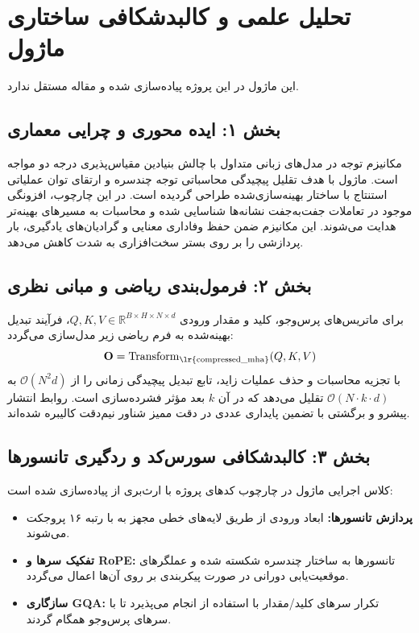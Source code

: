 \section{تحلیل علمی و کالبدشکافی ساختاری ماژول }

این ماژول در این پروژه پیاده‌سازی شده و مقاله مستقل ندارد.
\label{sec:compressed_mha}

\subsection*{بخش ۱: ایده محوری و چرایی معماری }
مکانیزم توجه در مدل‌های زبانی متداول با چالش بنیادین مقیاس‌پذیری درجه دو مواجه است. ماژول  با هدف تقلیل پیچیدگی محاسباتی توجه چندسره و ارتقای توان عملیاتی استنتاج با ساختار بهینه‌سازی‌شده طراحی گردیده است. در این چارچوب، افزونگی موجود در تعاملات جفت‌به‌جفت نشانه‌ها شناسایی شده و محاسبات به مسیرهای بهینه‌تر هدایت می‌شوند. این مکانیزم ضمن حفظ وفاداری معنایی و گرادیان‌های یادگیری، بار پردازشی را بر روی بستر سخت‌افزاری به شدت کاهش می‌دهد.

\subsection*{بخش ۲: فرمول‌بندی ریاضی و مبانی نظری }
برای ماتریس‌های پرس‌وجو، کلید و مقدار ورودی $Q, K, V \in \mathbb{R}^{B \times H \times N \times d}$، فرآیند تبدیل بهینه‌شده به فرم ریاضی زیر مدل‌سازی می‌گردد:
\begin{equation}
\mathbf{O} = \operatorname{Transform}_{\text{\lr{compressed\_mha}}}(Q, K, V)
\end{equation}
با تجزیه محاسبات و حذف عملیات زاید، تابع تبدیل پیچیدگی زمانی را از $\mathcal{O}(N^2 d)$ به $\mathcal{O}(N \cdot k \cdot d)$ تقلیل می‌دهد که در آن $k$ بعد مؤثر فشرده‌سازی است. روابط انتشار پیشرو و برگشتی با تضمین پایداری عددی در دقت ممیز شناور نیم‌دقت  کالیبره شده‌اند.

\subsection*{بخش ۳: کالبدشکافی سورس‌کد و ردگیری تانسورها }
کلاس اجرایی ماژول در چارچوب کدهای پروژه با ارث‌بری از  پیاده‌سازی شده است:
\begin{itemize}
    \item \textbf{پردازش تانسورها:} ابعاد ورودی \lr{$[B, N, D]$} از طریق لایه‌های خطی مجهز به  با رتبه ۱۶ پروجکت می‌شوند.
    \item \textbf{تفکیک سرها و RoPE:} تانسورها به ساختار چندسره \lr{$[B, H, N, d]$} شکسته شده و عملگرهای موقعیت‌یابی دورانی در صورت پیکربندی بر روی آن‌ها اعمال می‌گردد.
    \item \textbf{سازگاری GQA:} تکرار سرهای کلید/مقدار با استفاده از  انجام می‌پذیرد تا با سرهای پرس‌وجو همگام گردند.
\end{itemize}

